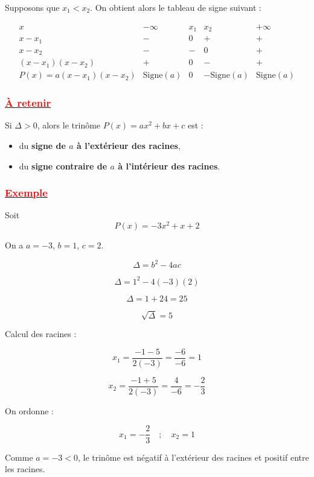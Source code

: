 \documentclass[12pt,a4paper]{article}
\begin{document}
Supposons que $x_1 < x_2$.  
On obtient alors le tableau de signe suivant :

\[
\begin{array}{c|cccc}
x & -\infty & x_1 & x_2 & +\infty \\
\hline
x - x_1 & - & 0 & + & + \\
x - x_2 & - & - & 0 & + \\
\hline
(x - x_1)(x - x_2) & + & 0 & - & + \\
\hline
P(x)=a(x-x_1)(x-x_2) 
& \text{Signe}(a) 
& 0 
& -\text{Signe}(a) 
& \text{Signe}(a)
\end{array}
\]
\subsubsection*{\underline{\textcolor{red}{À retenir}}}

Si $\Delta > 0$, alors le trinôme $P(x)=ax^2+bx+c$ est :

\begin{itemize}
    \item du \textbf{signe de $a$ à l’extérieur des racines},
    \item du \textbf{signe contraire de $a$ à l’intérieur des racines}.
\end{itemize}

\bigskip

\subsubsection*{\underline{\textcolor{red}{Exemple}}}

Soit 
\[
P(x) = -3x^2 + x + 2
\]

On a $a=-3$, $b=1$, $c=2$.

\[
\Delta = b^2 - 4ac
\]

\[
\Delta = 1^2 - 4(-3)(2)
\]

\[
\Delta = 1 + 24 = 25
\]

\[
\sqrt{\Delta} = 5
\]

\medskip

Calcul des racines :

\[
x_1 = \frac{-1 - 5}{2(-3)} = \frac{-6}{-6} = 1
\]

\[
x_2 = \frac{-1 + 5}{2(-3)} = \frac{4}{-6} = -\frac{2}{3}
\]

On ordonne :

\[
x_1 = -\frac{2}{3}
\quad ; \quad
x_2 = 1
\]

Comme $a=-3<0$, le trinôme est négatif à l’extérieur des racines
et positif entre les racines.
\end{document}
